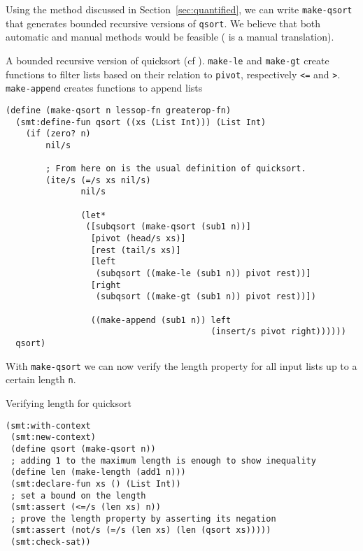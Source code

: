 Using the method discussed in Section~\ref{sec:quantified}, we can write
\texttt{make-qsort} that generates bounded recursive versions of
\texttt{qsort}. We believe that both automatic and manual methods would be
feasible ( is a manual translation).

\begin{program}

\caption[A bounded recursive version of quicksort]{A bounded recursive version
of quicksort (cf ). \texttt{make-le} and \texttt{make-gt}
create functions to filter lists based on their relation to \texttt{pivot},
respectively \texttt{<=} and \texttt{>}. \texttt{make-append} creates
functions to append lists}

\label{fig:qsort-smt}
\begin{verbatim}
(define (make-qsort n lessop-fn greaterop-fn)
  (smt:define-fun qsort ((xs (List Int))) (List Int)
    (if (zero? n)
        nil/s

        ; From here on is the usual definition of quicksort.
        (ite/s (=/s xs nil/s)
               nil/s

               (let*
                ([subqsort (make-qsort (sub1 n))]
                 [pivot (head/s xs)]
                 [rest (tail/s xs)]
                 [left
                  (subqsort ((make-le (sub1 n)) pivot rest))]
                 [right
                  (subqsort ((make-gt (sub1 n)) pivot rest))])

                 ((make-append (sub1 n)) left
                                         (insert/s pivot right))))))
  qsort)
\end{verbatim}
\end{program}

With \texttt{make-qsort} we can now verify the length property for all input
lists up to a certain length \texttt{n}.

\begin{program}
\caption{Verifying length for quicksort}
\begin{verbatim}
(smt:with-context
 (smt:new-context)
 (define qsort (make-qsort n))
 ; adding 1 to the maximum length is enough to show inequality
 (define len (make-length (add1 n)))
 (smt:declare-fun xs () (List Int))
 ; set a bound on the length
 (smt:assert (<=/s (len xs) n))
 ; prove the length property by asserting its negation
 (smt:assert (not/s (=/s (len xs) (len (qsort xs)))))
 (smt:check-sat))
\end{verbatim}
\end{program}


